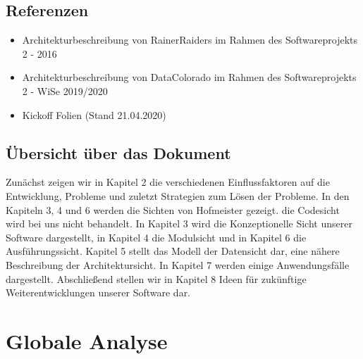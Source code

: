 \documentclass[fontsize=12pt,paper=a4,twoside]{scrartcl}
\begin{document}
\subsection{Referenzen}

\begin{itemize}
\item{Architekturbeschreibung von RainerRaiders im Rahmen des Softwareprojekts 2 - 2016}
\item{Architekturbeschreibung von DataColorado im Rahmen des Softwareprojekts 2 - WiSe 2019/2020}
\item{Kickoff Folien (Stand 21.04.2020)}
\end{itemize}

\subsection{Übersicht über das Dokument}

Zunächst zeigen wir in Kapitel 2 die verschiedenen Einflussfaktoren auf die Entwicklung, Probleme und zuletzt Strategien zum Lösen der Probleme. In den Kapiteln 3, 4 und 6 werden die Sichten von Hofmeister gezeigt. die Codesicht wird bei uns nicht behandelt. In Kapitel 3 wird die Konzeptionelle Sicht unserer Software dargestellt, in Kapitel 4 die Modulsicht und in Kapitel 6 die Ausführungssicht. Kapitel 5 stellt das Modell der Datensicht dar, eine nähere Beschreibung der Architektursicht. In Kapitel 7 werden einige Anwendungsfälle dargestellt. Abschließend stellen wir in Kapitel 8 Ideen für zukünftige Weiterentwicklungen unserer Software dar. 


\section{Globale Analyse} \label{sec:globale_analyse}


\end{document}
